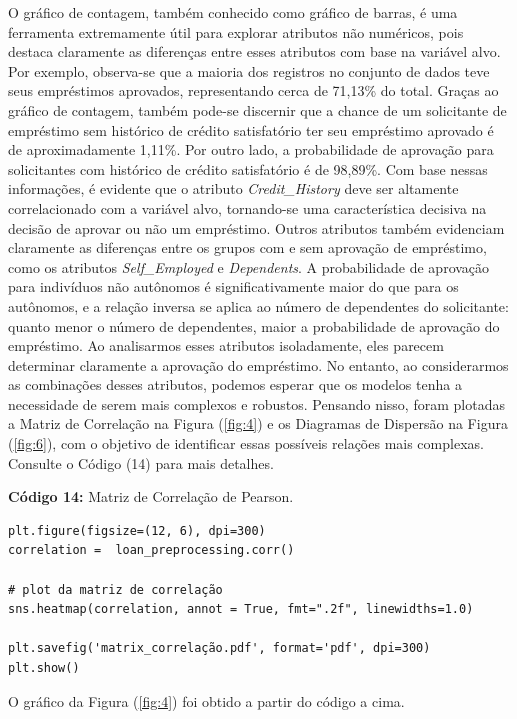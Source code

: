 \documentclass[a4paper,12pt]{article} %
\begin{document}
O gráfico de contagem, também conhecido como gráfico de barras, é uma ferramenta extremamente útil para explorar atributos não numéricos, pois destaca claramente as diferenças entre esses atributos com base na variável alvo. Por exemplo, observa-se que a maioria dos registros no conjunto de dados teve seus empréstimos aprovados, representando cerca de 71,13\% do total. Graças ao gráfico de contagem, também pode-se discernir que a chance de um solicitante de empréstimo sem histórico de crédito satisfatório ter seu empréstimo aprovado é de aproximadamente 1,11\%. Por outro lado, a probabilidade de aprovação para solicitantes com histórico de crédito satisfatório é de 98,89\%. Com base nessas informações, é evidente que o atributo \textit{Credit\_History} deve ser altamente correlacionado com a variável alvo, tornando-se uma característica decisiva na decisão de aprovar ou não um empréstimo. Outros atributos também evidenciam claramente as diferenças entre os grupos com e sem aprovação de empréstimo, como os atributos \textit{Self\_Employed} e \textit{Dependents}. A probabilidade de aprovação para indivíduos não autônomos é significativamente maior do que para os autônomos, e a relação inversa se aplica ao número de dependentes do solicitante: quanto menor o número de dependentes, maior a probabilidade de aprovação do empréstimo. Ao analisarmos esses atributos isoladamente, eles parecem determinar claramente a aprovação do empréstimo. No entanto, ao considerarmos as combinações desses atributos, podemos esperar que os modelos tenha a necessidade de serem mais complexos e robustos. Pensando nisso, foram plotadas a Matriz de Correlação na Figura (\ref{fig:4}) e os Diagramas de Dispersão na Figura (\ref{fig:6}), com o objetivo de identificar essas possíveis relações mais complexas. Consulte o Código (14) para mais detalhes.
\begin{center}
\textbf{Código 14:} Matriz de Correlação de Pearson.
\begin{verbatim}
plt.figure(figsize=(12, 6), dpi=300)
correlation =  loan_preprocessing.corr()

# plot da matriz de correlação
sns.heatmap(correlation, annot = True, fmt=".2f", linewidths=1.0)

plt.savefig('matrix_correlação.pdf', format='pdf', dpi=300)
plt.show()
\end{verbatim}
\end{center}

O gráfico da Figura (\ref{fig:4}) foi obtido a partir do código a cima.
\end{document}
